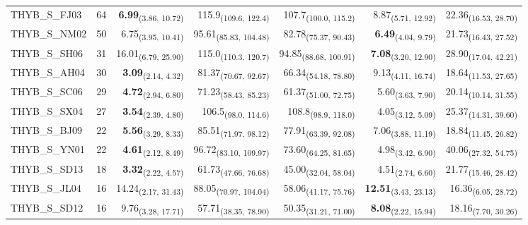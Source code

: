 \begin{table}[p]
\begin{tabular}{llrrrrr}
THYB\_S\_FJ03 & 64 & \textbf{6.99}\textsubscript{(3.86, 10.72)} & 115.9\textsubscript{(109.6, 122.4)} & 107.7\textsubscript{(100.0, 115.2)} & 8.87\textsubscript{(5.71, 12.92)} & 22.36\textsubscript{(16.53, 28.70)} \\
THYB\_S\_NM02 & 50 & 6.75\textsubscript{(3.95, 10.41)} & 95.61\textsubscript{(85.83, 104.48)} & 82.78\textsubscript{(75.37, 90.43)} & \textbf{6.49}\textsubscript{(4.04, 9.79)} & 21.73\textsubscript{(16.43, 27.52)} \\
THYB\_S\_SH06 & 31 & 16.01\textsubscript{(6.79, 25.90)} & 115.0\textsubscript{(110.3, 120.7)} & 94.85\textsubscript{(88.68, 100.91)} & \textbf{7.08}\textsubscript{(3.20, 12.90)} & 28.90\textsubscript{(17.04, 42.21)} \\
THYB\_S\_AH04 & 30 & \textbf{3.09}\textsubscript{(2.14, 4.32)} & 81.37\textsubscript{(70.67, 92.67)} & 66.34\textsubscript{(54.18, 78.80)} & 9.13\textsubscript{(4.11, 16.74)} & 18.64\textsubscript{(11.53, 27.65)} \\
THYB\_S\_SC06 & 29 & \textbf{4.72}\textsubscript{(2.94, 6.80)} & 71.23\textsubscript{(58.43, 85.23)} & 61.37\textsubscript{(51.00, 72.75)} & 5.60\textsubscript{(3.63, 7.90)} & 20.14\textsubscript{(10.14, 31.55)} \\
THYB\_S\_SX04 & 27 & \textbf{3.54}\textsubscript{(2.39, 4.80)} & 106.5\textsubscript{(98.0, 114.6)} & 108.8\textsubscript{(98.9, 118.0)} & 4.05\textsubscript{(3.12, 5.09)} & 25.37\textsubscript{(14.31, 39.60)} \\
THYB\_S\_BJ09 & 22 & \textbf{5.56}\textsubscript{(3.29, 8.33)} & 85.51\textsubscript{(71.97, 98.12)} & 77.91\textsubscript{(63.39, 92.08)} & 7.06\textsubscript{(3.88, 11.19)} & 18.84\textsubscript{(11.45, 26.82)} \\
THYB\_S\_YN01 & 22 & \textbf{4.61}\textsubscript{(2.12, 8.49)} & 96.72\textsubscript{(83.10, 109.97)} & 73.60\textsubscript{(64.25, 81.65)} & 4.98\textsubscript{(3.42, 6.90)} & 40.06\textsubscript{(27.32, 54.75)} \\
THYB\_S\_SD13 & 18 & \textbf{3.32}\textsubscript{(2.22, 4.57)} & 61.73\textsubscript{(47.66, 76.68)} & 45.00\textsubscript{(32.04, 58.04)} & 4.51\textsubscript{(2.74, 6.60)} & 21.77\textsubscript{(15.46, 28.42)} \\
THYB\_S\_JL04 & 16 & 14.24\textsubscript{(2.17, 31.43)} & 88.05\textsubscript{(70.97, 104.04)} & 58.06\textsubscript{(41.17, 75.76)} & \textbf{12.51}\textsubscript{(3.43, 23.13)} & 16.36\textsubscript{(6.05, 28.72)} \\
THYB\_S\_SD12 & 16 & 9.76\textsubscript{(3.28, 17.71)} & 57.71\textsubscript{(38.35, 78.90)} & 50.35\textsubscript{(31.21, 71.00)} & \textbf{8.08}\textsubscript{(2.22, 15.94)} & 18.16\textsubscript{(7.70, 30.26)} \\

\end{tabular}
\end{table}
